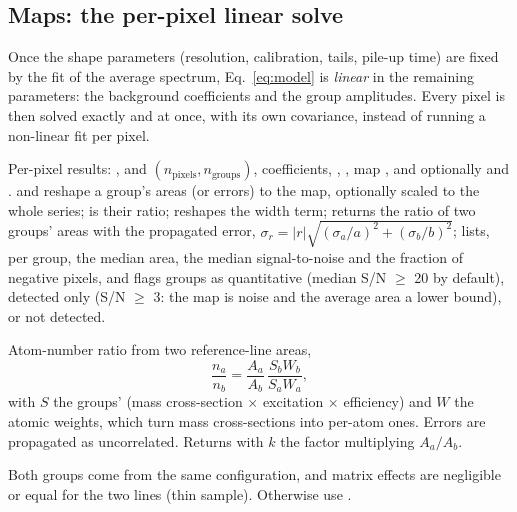 \subsection{Maps: the per-pixel linear solve}

Once the shape parameters (resolution, calibration, tails, pile-up time) are fixed by the fit
of the average spectrum, Eq.~\eqref{eq:model} is \emph{linear} in the remaining parameters:
the background coefficients and the group amplitudes. Every pixel is then solved exactly and
at once, with its own covariance, instead of running a non-linear fit per pixel.

Per-pixel results: ,  and  $(n_\mathrm{pixels},
n_\mathrm{groups})$,  coefficients, , , map
, and optionally  and .
 and  reshape a group's areas (or errors) to
the map, optionally scaled to the whole series;  is their ratio;
 reshapes the width term;  returns
the ratio of two groups' areas with the propagated error,
$\sigma_r = |r|\sqrt{(\sigma_a/a)^2+(\sigma_b/b)^2}$;  lists, per group, the
median area, the median signal-to-noise and the fraction of negative pixels, and flags groups
as quantitative (median S/N $\ge$ 20 by default), detected only (S/N $\ge$ 3: the map is noise
and the average area a lower bound), or not detected.

Atom-number ratio from two reference-line areas,
\begin{equation}
  \frac{n_a}{n_b} = \frac{A_a}{A_b}\,\frac{S_bW_b}{S_aW_a},
\end{equation}
with $S$ the groups'  (mass cross-section $\times$ excitation $\times$
efficiency) and $W$ the atomic weights, which turn mass cross-sections into per-atom ones.
Errors are propagated as uncorrelated. Returns  with $k$ the factor
multiplying $A_a/A_b$.
\begin{hyp}
Both groups come from the same  configuration, and matrix effects
are negligible or equal for the two lines (thin sample). Otherwise use
.
\end{hyp}

